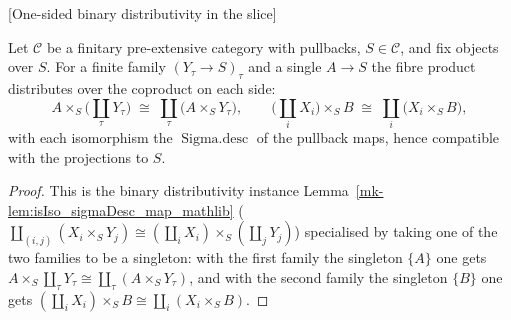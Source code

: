 \begin{lemma}

[One-sided binary distributivity in the slice]
  \label{mk-lem:prod_coproduct_distrib}

  Let \(\mathcal{C}\) be a finitary pre-extensive category with pullbacks, \(S \in \mathcal{C}\), and
  fix objects over \(S\). For a finite family \((Y_\tau \to S)_\tau\) and a single \(A \to S\) the
  fibre product distributes over the coproduct on each side:
  \[
    A \times_S \bigl(\textstyle\coprod_{\tau} Y_\tau\bigr)
      \;\cong\;
    \coprod_{\tau} \bigl(A \times_S Y_\tau\bigr),
    \qquad
    \bigl(\textstyle\coprod_{i} X_i\bigr) \times_S B
      \;\cong\;
    \coprod_{i} \bigl(X_i \times_S B\bigr),
  \]
  with each isomorphism the \(\operatorname{Sigma.desc}\) of the pullback maps, hence compatible with
  the projections to \(S\).
\end{lemma}
\begin{proof}
  This is the binary distributivity instance Lemma~\ref{mk-lem:isIso_sigmaDesc_map_mathlib}
  (\(\coprod_{(i,j)}(X_i \times_S Y_j) \cong (\coprod_i X_i)\times_S(\coprod_j Y_j)\)) specialised by
  taking one of the two families to be a singleton: with the first family the singleton \(\{A\}\)
  one gets \(A \times_S \coprod_\tau Y_\tau \cong \coprod_\tau (A \times_S Y_\tau)\), and with the
  second family the singleton \(\{B\}\) one gets \((\coprod_i X_i)\times_S B \cong \coprod_i (X_i
  \times_S B)\).
\end{proof}

